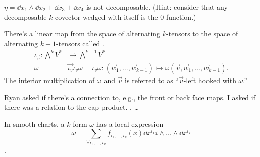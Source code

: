 \begin{ex}
    \label{ex:an_indecomposable_2_covector_on_r_4_}
    $\eta = \dd{x_1} \wedge \dd{x_2} + \dd{x_3} + \dd{x_4}$ is not decomposable.
    (Hint: consider that any decomposable $k$-covector wedged with itself is the $0$-function.)
\end{ex}

\begin{defn}
    \label{defn:interior_multiplication}
    There's a linear map from the space of alternating $k$-tensors to the space of alternating $k-1$-tensors called .
    \begin{align*}
        \iota_{\vec v} \colon
       \bigwedge^k V^*  &\to \bigwedge^{k-1} V^*\\
        \omega &\overset{\mapsto}{\iota_v} \iota_v \omega = \iota_v\omega : (\vec w_1, \ldots, \vec w_{k-1}) \mapsto \omega(\vec v, \vec w_1, \ldots, \vec w_{k-1}).
    \end{align*}
    The interior multiplication of $\omega$ and $\vec v$ is referred to as ``$\vec v$-left hooked with $\omega$.'' 
\end{defn}

Ryan asked if there's a connection to, e.g., the front or back face maps. I asked if there was a relation to the cap product. \TODO. \ldots


In smooth charts, a $k$-form $\omega$ has a local expression \begin{equation*}\omega = \sum\limits_{\forall i_1, \ldots, i_k} f_{i_1, \ldots, i_k}(x) \dd{x^{i_1}i \wedge \ldots \wedge \dd{x^{i_k}}}\end{equation*}.
